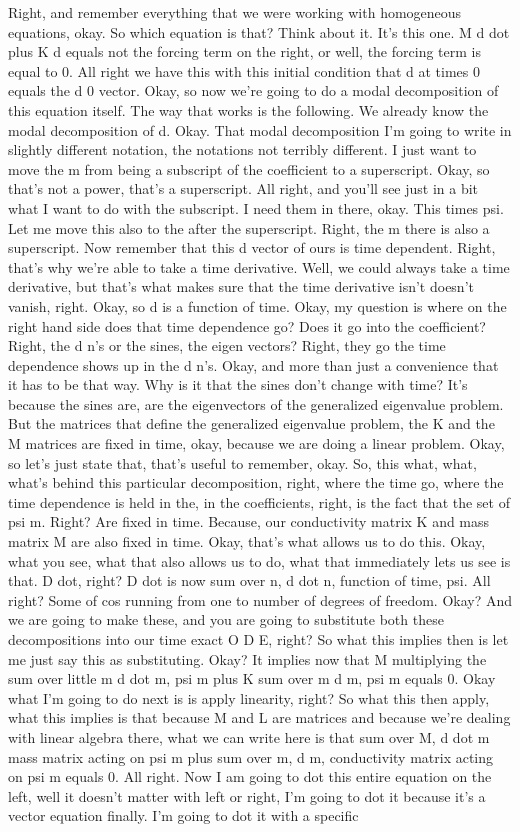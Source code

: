 \documentclass[10pt]{article}
\begin{document}
Right, and remember everything that we were working with homogeneous equations, okay. So which equation is that? Think about it. It's this one. M d dot plus K d equals not the forcing term on the right, or well, the forcing term is equal to 0. All right we have this with this initial condition that d at times 0 equals the d 0 vector. Okay, so now we're going to do a modal decomposition of this equation itself. The way that works is the following. We already know the modal decomposition of d. Okay. That modal decomposition I'm going to write in slightly different notation, the notations not terribly different. I just want to move the m from being a subscript of the coefficient to a superscript. Okay, so that's not a power, that's a superscript. All right, and you'll see just in a bit what I want to do with the subscript. I need them in there, okay. This times psi. Let me move this also to the after the superscript. Right, the m there is also a superscript. Now remember that this d vector of ours is time dependent. Right, that's why we're able to take a time derivative. Well, we could always take a time derivative, but that's what makes sure that the time derivative isn't doesn't vanish, right. Okay, so d is a function of time. Okay, my question is where on the right hand side does that time dependence go? Does it go into the coefficient? Right, the d n's or the sines, the eigen vectors? Right, they go the time dependence shows up in the d n's. Okay, and more than just a convenience that it has to be that way. Why is it that the sines don't change with time? It's because the sines are, are the eigenvectors of the generalized eigenvalue problem. But the matrices that define the generalized eigenvalue problem, the K and the M matrices are fixed in time, okay, because we are doing a linear problem. Okay, so let's just state that, that's useful to remember, okay. So, this what, what, what's behind this particular decomposition, right, where the time go, where the time dependence is held in the, in the coefficients, right, is the fact that the set of psi m. Right? Are fixed in time. Because, our conductivity matrix K and mass matrix M are also fixed in time. Okay, that's what allows us to do this. Okay, what you see, what that also allows us to do, what that immediately lets us see is that. D dot, right? D dot is now sum over n, d dot n, function of time, psi. All right? Some of cos running from one to number of degrees of freedom. Okay? And we are going to make these, and you are going to substitute both these decompositions into our time exact O D E, right? So what this implies then is let me just say this as substituting. Okay? It implies now that M multiplying the sum over little m d dot m, psi m plus K sum over m d m, psi m equals 0. Okay what I'm going to do next is is apply linearity, right? So what this then apply, what this implies is that because M and L are matrices and because we're dealing with linear algebra there, what we can write here is that sum over M, d dot m mass matrix acting on psi m plus sum over m, d m, conductivity matrix acting on psi m equals 0. All right. Now I am going to dot this entire equation on the left, well it doesn't matter with left or right, I'm going to dot it because it's a vector equation finally. I'm going to dot it with a specific 
\end{document}
